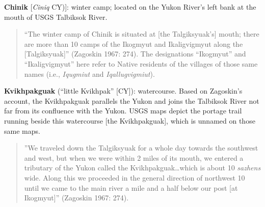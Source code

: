 \begin{hang}
\textbf{Chinik} [\textit{Ciniq} CY)]: winter camp; located on the Yukon River’s left bank at the mouth of USGS Talbiksok River.



\begin{quote}“The winter camp of Chinik is situated at [the Talgiksyuak’s] mouth; there are more than 10 camps of the Ikogmyut and Ikaligvigmyut along the [Talgiksyuak]” (Zagoskin 1967: 274). The designations “Ikogmyut” and “Ikaligvigmyut” here refer to Native residents of the villages of those same names (i.e., \textit{Iqugmiut} and \textit{Iqallugvigmiut}).
\end{quote}



\textbf{Kvikhpakguak} (“little Kvikhpak” [CY]): watercourse. Based on Zagoskin’s account, the Kvikhpakguak parallels the Yukon and joins the Talbiksok River not far from its confluence with the Yukon. USGS maps depict the portage trail running beside this watercourse [the Kvikhpakguak], which is unnamed on those same maps.



\begin{quote}”We traveled down the Talgiksyuak for a whole day towards the southwest and west, but when we were within 2 miles of its mouth, we entered a tributary of the Yukon called the Kvikhpakguak…which is about 10 \textit{sazhens} wide. Along this we proceeded in the general direction of northwest 10 until we came to the main river a mile and a half below our post [at Ikogmyut]” (Zagoskin 1967: 274).
\end{quote}



\end{hang}

